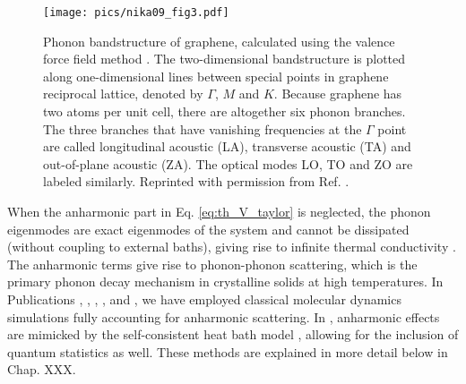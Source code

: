 \begin{figure}
\begin{center}
 \texttt{[image: pics/nika09\_fig3.pdf]}
 \caption{Phonon bandstructure of graphene, calculated using the valence force field method \cite{nika09}. The two-dimensional bandstructure is plotted along one-dimensional lines between special points in graphene reciprocal lattice, denoted by $\Gamma$, $M$ and $K$. Because graphene has two atoms per unit cell, there are altogether six phonon branches. The three branches that have vanishing frequencies at the $\Gamma$ point are called longitudinal acoustic (LA), transverse acoustic (TA) and out-of-plane acoustic (ZA). The optical modes LO, TO and ZO are labeled similarly. Reprinted with permission from Ref. \cite{nika09}.}
\label{fig:th_nika}
\end{center}
\end{figure} 

When the anharmonic part in Eq. \eqref{eq:th_V_taylor} is neglected, the phonon eigenmodes are exact eigenmodes of the system and cannot be dissipated (without coupling to external baths), giving rise to infinite thermal conductivity \cite{ziman}. The anharmonic terms give rise to phonon-phonon scattering, which is the primary phonon decay mechanism in crystalline solids at high temperatures. In Publications , , , , and , we have employed classical molecular dynamics simulations fully accounting for anharmonic scattering. In , anharmonic effects are mimicked by the self-consistent heat bath model \cite{bolsterli70}, allowing for the inclusion of quantum statistics as well. These methods are explained in more detail below in Chap. XXX.







